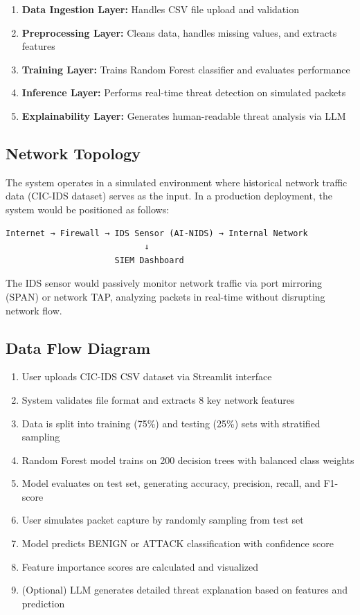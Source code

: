 \documentclass[12pt,a4paper]{article}
\begin{document}
\begin{enumerate}
    \item \textbf{Data Ingestion Layer:} Handles CSV file upload and validation
    \item \textbf{Preprocessing Layer:} Cleans data, handles missing values, and extracts features
    \item \textbf{Training Layer:} Trains Random Forest classifier and evaluates performance
    \item \textbf{Inference Layer:} Performs real-time threat detection on simulated packets
    \item \textbf{Explainability Layer:} Generates human-readable threat analysis via LLM
\end{enumerate}

\subsection{Network Topology}

The system operates in a simulated environment where historical network traffic data (CIC-IDS dataset) serves as the input. In a production deployment, the system would be positioned as follows:

\begin{verbatim}
Internet → Firewall → IDS Sensor (AI-NIDS) → Internal Network
                            ↓
                      SIEM Dashboard
\end{verbatim}

The IDS sensor would passively monitor network traffic via port mirroring (SPAN) or network TAP, analyzing packets in real-time without disrupting network flow.

\subsection{Data Flow Diagram}

\begin{enumerate}
    \item User uploads CIC-IDS CSV dataset via Streamlit interface
    \item System validates file format and extracts 8 key network features
    \item Data is split into training (75\%) and testing (25\%) sets with stratified sampling
    \item Random Forest model trains on 200 decision trees with balanced class weights
    \item Model evaluates on test set, generating accuracy, precision, recall, and F1-score
    \item User simulates packet capture by randomly sampling from test set
    \item Model predicts BENIGN or ATTACK classification with confidence score
    \item Feature importance scores are calculated and visualized
    \item (Optional) LLM generates detailed threat explanation based on features and prediction
\end{enumerate}
\end{document}
